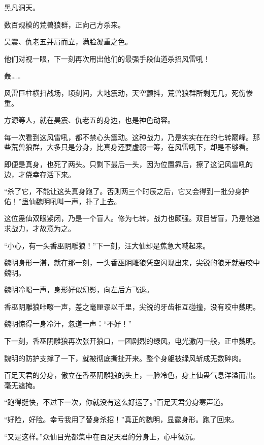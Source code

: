 
\begin{this_body}



黑凡洞天。

数百规模的荒兽狼群，正向己方杀来。

昊震、仇老五并肩而立，满脸凝重之色。

他们对视一眼，下一刻再次用出他们的最强手段仙道杀招风雷吼！

轰……

风雷巨柱横扫战场，顷刻间，大地震动，天空颤抖，荒兽狼群所剩无几，死伤惨重。

方源等人，就在昊震、仇老五的身边，也是神色动容。

每一次看到这风雷吼，都不禁心头震动。这种战力，乃是实实在在的七转巅峰。那些荒兽狼群，大多只是分身，比真身还要虚弱一筹，在风雷吼下，却是不够看。

即便是真身，也死了两头。只剩下最后一头，因为位置靠后，擦了这记风雷吼的边，才侥幸存活下来。

“杀了它，不能让这头真身跑了。否则两三个时辰之后，它又会得到一批分身护佑！”蛊仙魏明吼叫一声，扑了上去。

这位蛊仙双眼紧闭，乃是一个盲人。修为七转，战力也颇强。双目皆盲，乃是他追求战力，才故意为之。

“小心，有一头香巫阴雕狼！”下一刻，汪大仙却是焦急大喊起来。

魏明身形一滞，就在那一刻，一头香巫阴雕狼凭空闪现出来，尖锐的狼牙就要咬中魏明。

魏明冷喝一声，身形好似幻影，向左后方飞退。

香巫阴雕狼咔嚓一声，差之毫厘谬以千里，尖锐的牙齿相互碰撞，没有咬中魏明。

魏明惊得一身冷汗，忽道一声：“不好！”

下一刻，香巫阴雕狼再次张开狼口，一团剧烈的绿风，电光激闪一般，正中魏明。

魏明的防护支撑了一下，就被彻底撕扯开来。整个身躯被绿风斩成无数碎肉。

百足天君的分身，傲立在香巫阴雕狼的头上，一脸冷色，身上仙蛊气息洋溢而出。毫无遮掩。

“跑得挺快，不过下一次，你就没有这么好运了。”百足天君分身寒声道。

“好险，好险。幸亏我用了替身杀招！”真正的魏明，显露身形。跑了回来。

“又是这样。”众仙目光都集中在百足天君的分身上，心中微沉。


\end{this_body}
